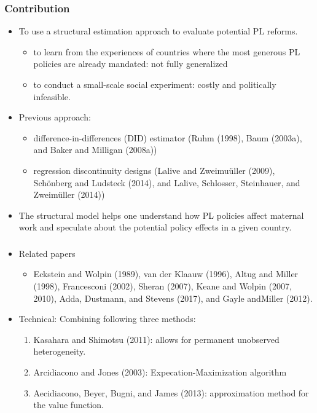 \documentclass[dvipdfmx,11pt]{beamer}
\begin{document}
\begin{frame}\frametitle{Contribution}
  \begin{itemize}
    \item To use a structural estimation approach to evaluate potential PL reforms.
    \begin{itemize}
      \item to learn from the experiences of countries where the most generous PL policies are already mandated: not fully generalized
      \item to conduct a small-scale social experiment: costly and politically infeasible.
    \end{itemize}
    \item Previous approach:
    \begin{itemize}
      \item difference-in-differences (DID) estimator (Ruhm (1998), Baum (2003a), and Baker and Milligan (2008a))
      \item regression discontinuity designs (Lalive and Zweimu\"{u}ller (2009), Sch\"{o}nberg and Ludsteck (2014), and Lalive, Schlosser, Steinhauer, and Zweim\"{u}ller (2014))
    \end{itemize}
    \item The structural model helps one understand how PL policies affect maternal work and speculate about the potential policy effects in a given country.
  \end{itemize}
\end{frame}

\begin{frame}\frametitle{}
  \begin{itemize}
    \item Related papers
    \begin{itemize}
      \item Eckstein and Wolpin (1989), van der Klaauw (1996), Altug and Miller (1998), Francesconi (2002), Sheran (2007), Keane and Wolpin (2007, 2010), Adda, Dustmann, and Stevens (2017), and Gayle andMiller (2012).
    \end{itemize}
  \end{itemize}
  \begin{itemize}
    \item Technical: Combining following three methods:
    \begin{enumerate}
      \item Kasahara and Shimotsu (2011): allows for permanent unobserved heterogeneity.
      \item Arcidiacono and Jones (2003): Expecation-Maximization algorithm
      \item Aecidiacono, Beyer, Bugni, and James (2013): approximation method for the value function.
    \end{enumerate}
  \end{itemize}
\end{frame}
\end{document}
